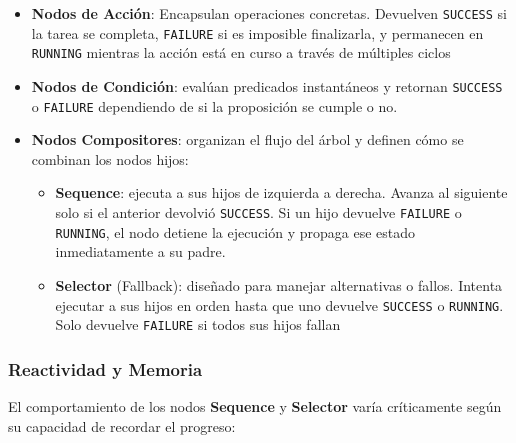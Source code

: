 \documentclass{prgrado}
\begin{document}
\begin{itemize}
    \item \textbf{Nodos de Acción}:  Encapsulan operaciones concretas. Devuelven \texttt{SUCCESS} si la tarea se completa, \texttt{FAILURE} si es imposible finalizarla, y permanecen en \texttt{RUNNING} mientras la acción está en curso a través de múltiples ciclos
    \item \textbf{Nodos de Condición}: evalúan predicados instantáneos y retornan \texttt{SUCCESS} o \texttt{FAILURE} dependiendo de si la proposición se cumple o no.
    \item \textbf{Nodos Compositores}: organizan el flujo del árbol y definen cómo se combinan los nodos hijos:
    \begin{itemize}
        \item \textbf{Sequence}: ejecuta a sus hijos de izquierda a derecha. Avanza al siguiente solo si el anterior devolvió \texttt{SUCCESS}. Si un hijo devuelve \texttt{FAILURE} o \texttt{RUNNING}, el nodo detiene la ejecución y propaga ese estado inmediatamente a su padre.
        \item \textbf{Selector} (Fallback): diseñado para manejar alternativas o fallos. Intenta ejecutar a sus hijos en orden hasta que uno devuelve \texttt{SUCCESS} o \texttt{RUNNING}. Solo devuelve \texttt{FAILURE} si todos sus hijos fallan
    \end{itemize}
\end{itemize}

\subsubsection{Reactividad y Memoria}

El comportamiento de los nodos \textbf{Sequence} y \textbf{Selector} varía críticamente según su capacidad de recordar el progreso:
\end{document}
